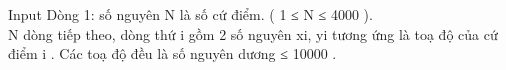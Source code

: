 Input
Dòng 1: số nguyên N là số cứ điểm. ( 1 ≤ N ≤ 4000 ).   
\\   N dòng tiếp theo, dòng thứ i gồm 2 số nguyên xi, yi tương ứng là toạ độ của cứ điểm i . Các toạ độ đều là số nguyên dương ≤ 10000 .